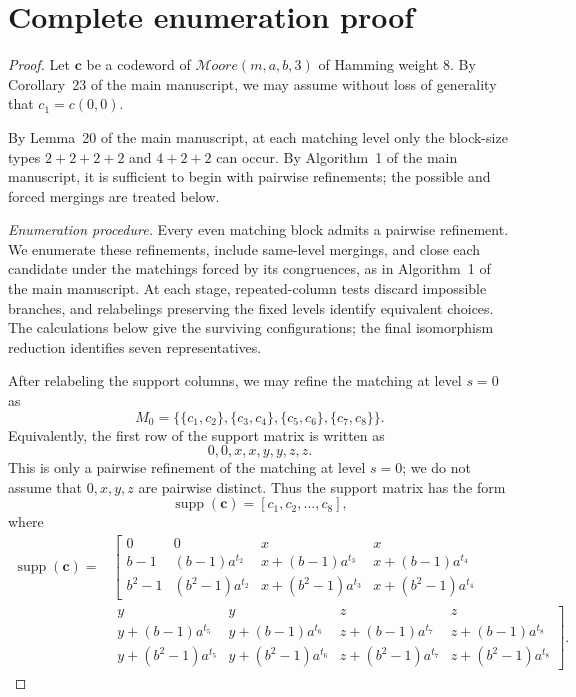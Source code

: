 \documentclass[11pt]{article}
\newcommand{\suppc}{\operatorname{supp}(\mathbf{c})}
\newcommand{\boldc}{\boldsymbol{c}}
\newcommand{\Moore}{\mathcal{M}oore}
\begin{document}
\section{Complete enumeration proof}
\begin{proof}
Let $\boldc$ be a codeword of $\Moore(m,a,b,3)$ of Hamming weight $8$. By Corollary~23 of the main manuscript, we may assume without loss of generality that $c_1=c(0,0)$.

By Lemma~20 of the main manuscript, at each matching level only the block-size types $2+2+2+2$ and $4+2+2$ can occur. By Algorithm~1 of the main manuscript, it is sufficient to begin with pairwise refinements; the possible and forced mergings are treated below.

\emph{Enumeration procedure.} Every even matching block admits a pairwise refinement. We enumerate these refinements, include same-level mergings, and close each candidate under the matchings forced by its congruences, as in Algorithm~1 of the main manuscript. At each stage, repeated-column tests discard impossible branches, and relabelings preserving the fixed levels identify equivalent choices. The calculations below give the surviving configurations; the final isomorphism reduction identifies seven representatives.

After relabeling the support columns, we may refine the matching at level $s=0$ as
$$
M_0=
\bigl\{
\{c_1,c_2\},
\{c_3,c_4\},
\{c_5,c_6\},
\{c_7,c_8\}
\bigr\}.
$$
Equivalently, the first row of the support matrix is written as
$$
0,0,x,x,y,y,z,z.
$$
This is only a pairwise refinement of the matching at level $s=0$;
we do not assume that $0,x,y,z$ are pairwise distinct. Thus the
support matrix has the form
$$
\suppc=[c_1,c_2,\ldots,c_8],
$$
where
$$
\begin{aligned}
    \suppc
    =&\left[
    \begin{array}{cccc}
        0 & 0 & x & x \\
        b-1 & (b-1)a^{t_2}
        & x+(b-1)a^{t_3} & x+(b-1)a^{t_4} \\
        b^2-1 & (b^2-1)a^{t_2}
        & x+(b^2-1)a^{t_3} & x+(b^2-1)a^{t_4}
    \end{array}
    \right. \\
    &\left.
    \begin{array}{cccc}
        y & y & z & z \\
        y+(b-1)a^{t_5} & y+(b-1)a^{t_6}
        & z+(b-1)a^{t_7} & z+(b-1)a^{t_8} \\
        y+(b^2-1)a^{t_5} & y+(b^2-1)a^{t_6}
        & z+(b^2-1)a^{t_7} & z+(b^2-1)a^{t_8}
    \end{array}
    \right].
\end{aligned}
$$


\end{proof}
\end{document}
